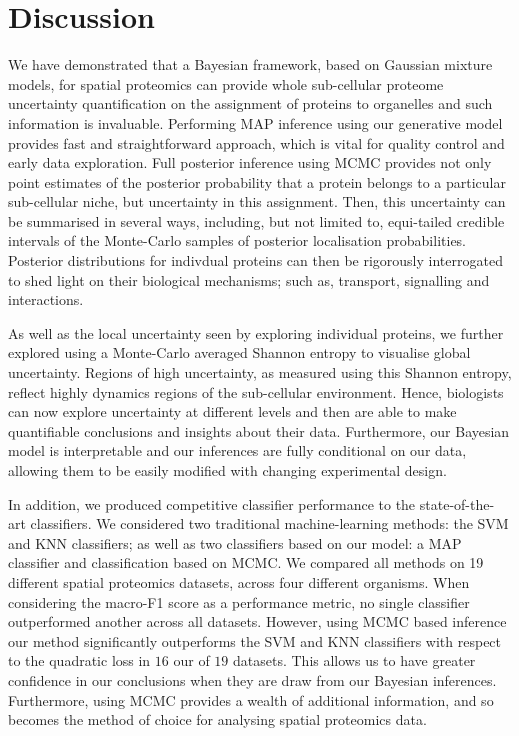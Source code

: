 \documentclass[10pt,letterpaper]{article}\usepackage[]{graphicx}\usepackage[]{color}
\begin{document}
\section*{Discussion}

We have demonstrated that a Bayesian framework, based on Gaussian
mixture models, for spatial proteomics can provide whole sub-cellular
proteome uncertainty quantification on the assignment of proteins to
organelles and such information is invaluable. Performing MAP
inference using our generative model provides fast and straightforward
approach, which is vital for quality control and early data
exploration. Full posterior inference using MCMC provides not only
point estimates of the posterior probability that a protein belongs to
a particular sub-cellular niche, but uncertainty in this
assignment. Then, this uncertainty can be summarised in several ways,
including, but not limited to, equi-tailed credible intervals of the
Monte-Carlo samples of posterior localisation probabilities.
Posterior distributions for indivdual proteins can then be rigorously
interrogated to shed light on their biological mechanisms; such as,
transport, signalling and interactions.

As well as the local uncertainty seen by exploring individual
proteins, we further explored using a Monte-Carlo averaged Shannon
entropy to visualise global uncertainty. Regions of high uncertainty,
as measured using this Shannon entropy, reflect highly dynamics
regions of the sub-cellular environment.  Hence, biologists can now
explore uncertainty at different levels and then are able to make
quantifiable conclusions and insights about their data.  Furthermore,
our Bayesian model is interpretable and our inferences are fully
conditional on our data, allowing them to be easily modified with
changing experimental design.

In addition, we produced competitive classifier performance to the
state-of-the-art classifiers. We considered two traditional
machine-learning methods: the SVM and KNN classifiers; as well as two
classifiers based on our model: a MAP classifier and classification
based on MCMC. We compared all methods on 19 different spatial
proteomics datasets, across four different organisms. When considering
the macro-F1 score as a performance metric, no single classifier
outperformed another across all datasets. However, using MCMC based
inference our method significantly outperforms the SVM and KNN
classifiers with respect to the quadratic loss in $16$ our of $19$
datasets. This allows us to have greater confidence in our conclusions
when they are draw from our Bayesian inferences. Furthermore, using
MCMC provides a wealth of additional information, and so becomes the
method of choice for analysing spatial proteomics data.
\end{document}
